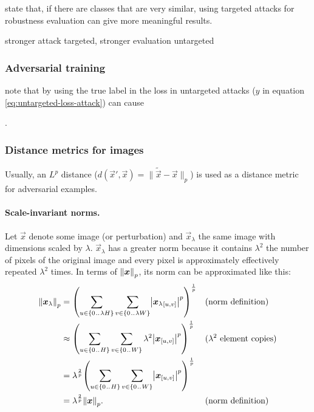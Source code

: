 \documentclass{article}
\begin{document}
\citet{Athalye:2018:OGGFSS} state that, if there are classes that are very similar, using targeted attacks for robustness evaluation can give more meaningful results. 

stronger attack targeted, stronger evaluation untargeted

\subsubsection{Adversarial training}

\citet{Kurakin:2016:AMLS} note that by using the true label in the loss in untargeted attacks ($y$ in equation \eqref{eq:untargeted-loss-attack}) can cause


\newpage
.
\newpage
\subsubsection{Distance metrics for images}

Usually, an $L^p$ distance ($d(\vec x', \vec x)=\lVert\tilde{\vec x}-\vec x\rVert_p$) is used as a distance metric for adversarial examples.

\paragraph{Scale-invariant norms.}
Let $\vec x$ denote some image (or perturbation) and $\vec x_\lambda$ the same image with dimensions scaled by $\lambda$. $\vec x_\lambda$ has a greater norm because it contains $\lambda^2$ the number of pixels of the original image and every pixel is approximately effectively repeated $\lambda^2$ times. In terms of $\enVert{\vec x}_p$, its norm can be approximated like this:
\begin{align*}
    \enVert{\vec x_\lambda}_p 
    &= \del{\sum_{u\in\cbr{0\bidot\lambda H}}\sum_{v\in\cbr{0\bidot\lambda W}} \envert{{\vec x_\lambda}_\ind{u, v}}^p}^{\frac{1}{p}} && \text{(norm definition)} \\
    &\approx \del{\sum_{u\in\cbr{0\bidot H}}\sum_{v\in\cbr{0\bidot W}} \lambda^2 \envert{{\vec x}_\ind{u, v}}^p}^{\frac{1}{p}} && \text{($\lambda^2$ element copies)} \\
    &= \lambda^\frac{2}{p} \del{\sum_{u\in\cbr{0\bidot H}}\sum_{v\in\cbr{0\bidot W}} \envert{{\vec x}_\ind{u, v}}^p}^{\frac{1}{p}} \\
    &= \lambda^\frac{2}{p} \enVert{\vec x}_p \text{.} && \text{(norm definition)}
\end{align*}
\end{document}
